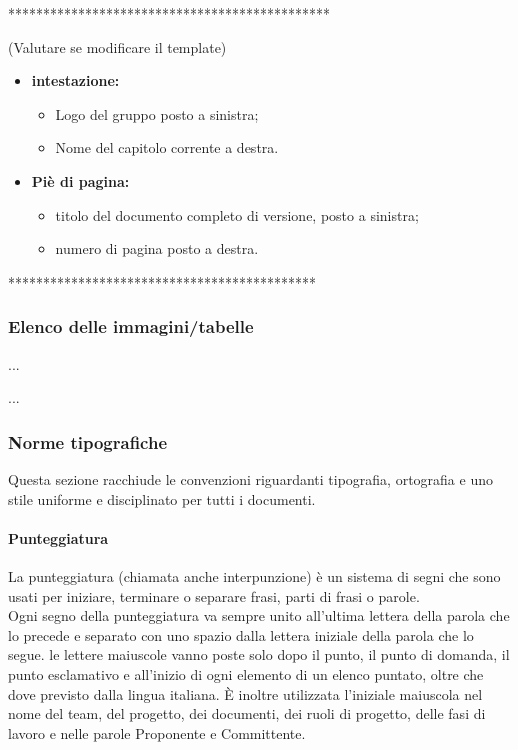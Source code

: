 **********************************************

(Valutare se modificare il template)
\begin{itemize}
	\item \textbf{intestazione:}
	\begin{itemize}
		\item Logo del gruppo posto a sinistra;
		\item Nome del capitolo corrente a destra. 
	\end{itemize}
	\item \textbf {Piè di pagina:}
	\begin{itemize}
	\item titolo del documento completo di versione, posto a sinistra;
	\item numero di pagina posto a destra.
	\end{itemize}

\end{itemize}
 ********************************************
 
 \subsubsection{Elenco delle immagini/tabelle}
 ...
 
 ...
\subsubsection{Norme tipografiche}
Questa sezione racchiude le convenzioni riguardanti tipografia, ortografia e uno stile
uniforme e disciplinato per tutti i documenti.
\paragraph{Punteggiatura}
La punteggiatura (chiamata anche interpunzione) è un sistema di segni che sono usati per iniziare, terminare o separare frasi, parti di frasi o parole. \\
Ogni segno della punteggiatura va sempre unito all'ultima lettera della parola che lo precede e separato con uno spazio dalla lettera iniziale della parola che lo segue.
le lettere maiuscole vanno poste solo dopo il punto, il punto di domanda, il punto esclamativo e all’inizio di ogni elemento di un elenco puntato, oltre che dove previsto dalla lingua italiana. È inoltre utilizzata l’iniziale maiuscola nel nome del team, del progetto, dei documenti, dei ruoli di progetto, delle fasi di
lavoro e nelle parole Proponente e Committente.

